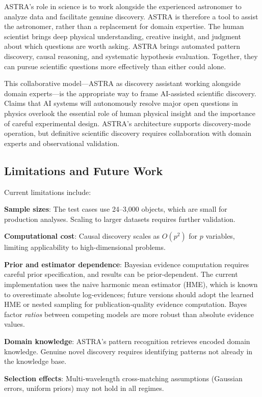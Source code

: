 \documentclass[usenatbib]{rasti}
\begin{document}
ASTRA's role in science is to work alongside the experienced astronomer to analyze data and facilitate genuine discovery. ASTRA is therefore a tool to assist the astronomer, rather than a replacement for domain expertise. The human scientist brings deep physical understanding, creative insight, and judgment about which questions are worth asking. ASTRA brings automated pattern discovery, causal reasoning, and systematic hypothesis evaluation. Together, they can pursue scientific questions more effectively than either could alone.

This collaborative model---ASTRA as discovery assistant working alongside domain experts---is the appropriate way to frame AI-assisted scientific discovery. Claims that AI systems will autonomously resolve major open questions in physics overlook the essential role of human physical insight and the importance of careful experimental design. ASTRA's architecture supports discovery-mode operation, but definitive scientific discovery requires collaboration with domain experts and observational validation.

\subsection{Limitations and Future Work}

Current limitations include:
\begin{description}
\item \textbf{Sample sizes}: The test cases use 24--3,000 objects, which are small for production analyses. Scaling to larger datasets requires further validation.
\item \textbf{Computational cost}: Causal discovery scales as $O(p^2)$ for $p$ variables, limiting applicability to high-dimensional problems.
\item \textbf{Prior and estimator dependence}: Bayesian evidence computation requires careful prior specification, and results can be prior-dependent. The current implementation uses the naive harmonic mean estimator (HME), which is known to overestimate absolute log-evidences; future versions should adopt the learned HME or nested sampling \citep{skilling2004} for publication-quality evidence computation. Bayes factor \emph{ratios} between competing models are more robust than absolute evidence values.
\item \textbf{Domain knowledge}: ASTRA's pattern recognition retrieves encoded domain knowledge. Genuine novel discovery requires identifying patterns not already in the knowledge base.
\item \textbf{Selection effects}: Multi-wavelength cross-matching assumptions (Gaussian errors, uniform priors) may not hold in all regimes.
\end{description}
\end{document}
